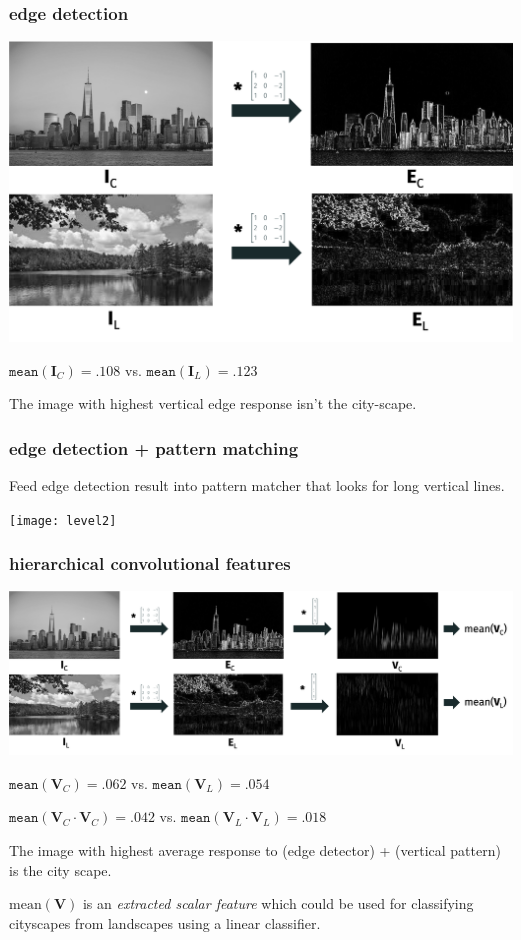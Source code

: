 \documentclass[handout,compress]{beamer}
\newcommand{\bv}[1]{\mathbf{#1}}
\begin{document}
\begin{frame}
	\small
	\frametitle{edge detection}
	\begin{center}
	\includegraphics[width=.9\textwidth]{scape_edge.png}
	
	$\texttt{mean}(\bv{I}_C) = .108$ \hspace{1em} vs. \hspace{1em} $\texttt{mean}(\bv{I}_L) = .123$
	\end{center}
The image with highest vertical edge response isn't the city-scape.
\end{frame}

\begin{frame}
	\frametitle{edge detection + pattern matching}
	Feed edge detection result into pattern matcher that looks for long vertical lines.
	\begin{center}
		\texttt{[image: level2]}
		
	\end{center}
\end{frame}

\begin{frame}
	\frametitle{hierarchical convolutional features}
	\small
	\begin{center}
	\includegraphics[width=\textwidth]{hier.png}
	
	$\texttt{mean}(\bv{V}_C) = .062$ \hspace{1em} vs. $\texttt{mean}(\bv{V}_L) = .054$
	
	$\texttt{mean}(\bv{V}_C\cdot \bv{V}_C) = .042$ \hspace{1em} vs. $\texttt{mean}(\bv{V}_L\cdot \bv{V}_L) = .018$
	\end{center}
	The image with highest average response to (edge detector) + (vertical pattern) is the city scape. 
	
	$\text{mean}(\bv{V})$ is an \emph{extracted scalar feature} which could be used for classifying cityscapes from landscapes using a linear classifier.
	
\end{frame}
\end{document}
